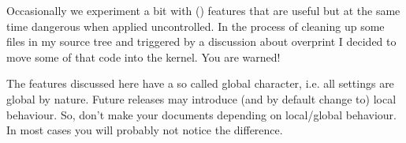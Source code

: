 
%


\setupcolors[rgb=no,cmyk=yes]

\definecolor[red]      [c=.25,m=.75,y=.75,k=.25]
\definecolor[green]    [c=.75,m=.25,y=.75,k=.25]
\definecolor[blue]     [c=.75,m=.75,y=.25,k=.25]

\definecolor[tred]     [c=.25,m=.75,y=.75,k=.25,t=.5,a=1]
\definecolor[tgreen]   [c=.75,m=.25,y=.75,k=.25,t=.5,a=1]
\definecolor[tblue]    [c=.75,m=.75,y=.25,k=.25,t=.5,a=1]
\definecolor[tblack]   [s=0,t=.75,a=1]

\definecolor[ocyan]    [c=.75]
\definecolor[omagenta] [m=.75]
\definecolor[oyellow]  [y=.75]
\definecolor[ogray]    [s=.5]

\startbuffer[abstract]
    Occasionally we experiment a bit with (\PDF) features that are useful but at
    the same time dangerous when applied uncontrolled. In the process of cleaning
    up some files in my source tree and triggered by a discussion about overprint
    I decided to move some of that code into the kernel. You are warned!
\stopbuffer


\startdocument
  [title={A Few Dangerous Features},
   author=Hans Hagen,
   affiliation=PRAGMA ADE,
   date=June 2004,
   number=6 \MKIV]

\subject{Remark}

The features discussed here have a so called global character, i.e. all settings
are global by nature. Future releases may introduce (and by default change to)
local behaviour. So, don't make your documents depending on local/global
behaviour. In most cases you will probably not notice the difference.

